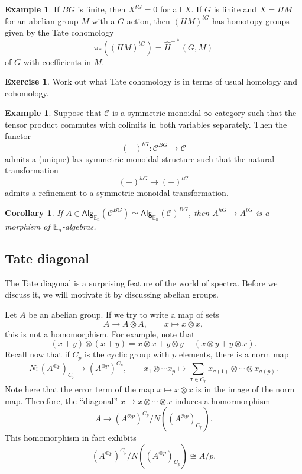 \documentclass[10pt, oneside]{memoir}
\newtheorem{cor}[thm]{Corollary}
\theoremstyle{definition}
\newtheorem{exm}[thm]{Example}
\newtheorem{exer}[thm]{Exercise}
\theoremstyle{remark}
\theoremstyle{plain}
\theoremstyle{definition}
\theoremstyle{remark}
\newcommand{\E}{\mathbb{E}}
\newcommand{\mc}[1]{\mathcal{#1}}
\newcommand{\ms}[1]{\mathsf{#1}}
\newcommand{\1}{\mathbf{1}}
\newcommand{\2}{\mathbf{2}}
\newcommand{\3}{\mathbf{3}}
\begin{document}
\begin{exm}
    If $BG$ is finite, then $X^{tG} = 0$ for all $X$. If $G$ is finite and $X = HM$ for an abelian group $M$ with a $G$-action, then $(HM)^{tG}$ has homotopy groups given by the Tate cohomology
    \[ \pi_* ((HM)^{tG}) = \hat{H}^{-*}(G, M) \]
    of $G$ with coefficients in $M$.
\end{exm}

\begin{exer}
    Work out what Tate cohomology is in terms of usual homology and cohomology.
\end{exer}

\begin{exm}
    Suppose that $\mc{C}$ is a symmetric monoidal $\infty$-category such that the tensor product commutes with colimits in both variables separately. Then the functor
    \[ (-)^{tG} \colon \mc{C}^{BG} \to \mc{C} \]
    admits a (unique) lax symmetric monoidal structure such that the natural transformation
    \[ (-)^{hG} \to (-)^{tG} \]
    admits a refinement to a symmetric monoidal transformation.
\end{exm}

\begin{cor}
    If $A \in \ms{Alg}_{\E_n}(\mc{C}^{BG}) \simeq \ms{Alg}_{\E_n}(\mc{C})^{BG}$, then $A^{hG} \to A^{tG}$ is a morphism of $\E_n$-algebras.
\end{cor}

\subsection{Tate diagonal}%
\label{sub:Tate diagonal}

The Tate diagonal is a surprising feature of the world of spectra. Before we discuss it, we will motivate it by discussing abelian groups.

Let $A$ be an abelian group. If we try to write a map of sets
\[ A \to A \otimes A, \qquad x \mapsto x\otimes x, \]
this is not a homomorphism. For example, note that
\[ (x+y) \otimes (x+y) = x \otimes x + y \otimes y + (x\otimes y + y \otimes x). \]
Recall now that if $C_p$ is the cyclic group with $p$ elements, there is a norm map
\[ N \colon (A^{\otimes p})_{C_p} \to (A^{\otimes p})^{C_p}, \qquad x_1 \otimes \cdots x_p \mapsto \sum_{\sigma \in C_p} x_{\sigma(1)} \otimes \cdots \otimes x_{\sigma(p)}. \]
Note here that the error term of the map $x \mapsto x \otimes x$ is in the image of the norm map. Therefore, the ``diagonal'' $x \mapsto x \otimes \cdots \otimes x$ induces a homormorphism
\[ A \to (A^{\otimes p})^{C_p}/N((A^{\otimes p})_{C_p}). \]
This homomorphism in fact exhibits
\[ (A^{\otimes p})^{C_p} / N((A^{\otimes p})_{C_p}) \cong A/p. \]
\end{document}
